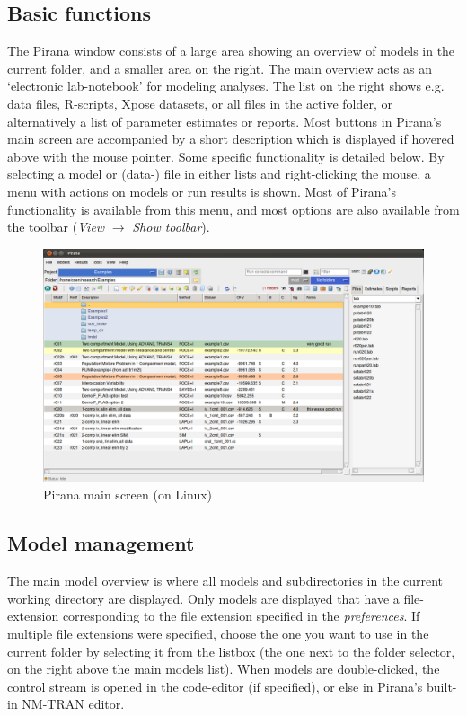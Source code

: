 {\subsection{Basic functions} The Pirana window consists of a large
area showing an overview of models in the current folder, and a
smaller area on the right. The main overview acts as an `electronic lab-notebook' for 
modeling analyses. The list on the right shows e.g. data files, R-scripts,
Xpose datasets, or all files in the active folder, or alternatively a
list of parameter estimates or reports. Most buttons in Pirana's main
screen are accompanied by a short description which is displayed if
hovered above with the mouse pointer. Some specific functionality is
detailed below. By selecting a model or (data-) file in either lists
and right-clicking the mouse, a menu with actions on models or run
results is shown. Most of Pirana's functionality is available from
this menu, and most options are also available from the toolbar
(\textit{View} $\rightarrow$ \textit{Show toolbar}).

\begin{figure}[H] \centering
    \includegraphics[scale=0.25]{images/pirana_main_screen.png}
    \caption{Pirana main screen (on Linux)}
\end{figure}

\subsection{Model management} The main model overview is 
where all models and subdirectories in the current working directory
are displayed. Only models are displayed that have a file-extension
corresponding to the file extension specified in the
\textit{preferences}. If multiple file extensions were specified, choose the
one you want to use in the current folder by selecting it from the listbox 
(the one next to the folder selector, on the right above the main models list). 
When models are double-clicked, the control stream is opened in the
code-editor (if specified), or else in Pirana's built-in NM-TRAN
editor.

}

